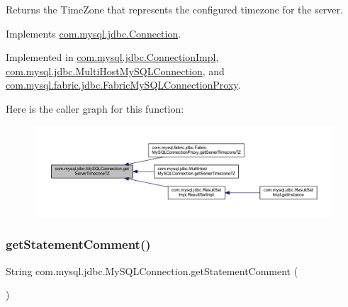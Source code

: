 Returns the Time\+Zone that represents the configured timezone for the server. 

Implements \mbox{\hyperlink{interfacecom_1_1mysql_1_1jdbc_1_1_connection_aa824ea2a868be95bd6a21119445838b8}{com.\+mysql.\+jdbc.\+Connection}}.



Implemented in \mbox{\hyperlink{classcom_1_1mysql_1_1jdbc_1_1_connection_impl_ac1fa3018d7b3c139355f45e55f37fd15}{com.\+mysql.\+jdbc.\+Connection\+Impl}}, \mbox{\hyperlink{classcom_1_1mysql_1_1jdbc_1_1_multi_host_my_s_q_l_connection_a6cd4e5250d8940bbbfeb6d5a4a4efb45}{com.\+mysql.\+jdbc.\+Multi\+Host\+My\+S\+Q\+L\+Connection}}, and \mbox{\hyperlink{classcom_1_1mysql_1_1fabric_1_1jdbc_1_1_fabric_my_s_q_l_connection_proxy_aa7681c7b1a3e0e15195537b76729ad3b}{com.\+mysql.\+fabric.\+jdbc.\+Fabric\+My\+S\+Q\+L\+Connection\+Proxy}}.

Here is the caller graph for this function\+:
\nopagebreak
\begin{figure}[H]
\begin{center}
\leavevmode
\includegraphics[width=350pt]{interfacecom_1_1mysql_1_1jdbc_1_1_my_s_q_l_connection_a28586f911062106cb730733427568fc7_icgraph}
\end{center}
\end{figure}
\mbox{\label{interfacecom_1_1mysql_1_1jdbc_1_1_my_s_q_l_connection_aca7bbebb7ec6fa745218e6dca38cfaad}} 
\subsubsection{\texorpdfstring{get\+Statement\+Comment()}{getStatementComment()}}
{\footnotesize\ttfamily String com.\+mysql.\+jdbc.\+My\+S\+Q\+L\+Connection.\+get\+Statement\+Comment (\begin{DoxyParamCaption}{ }\end{DoxyParamCaption})}

